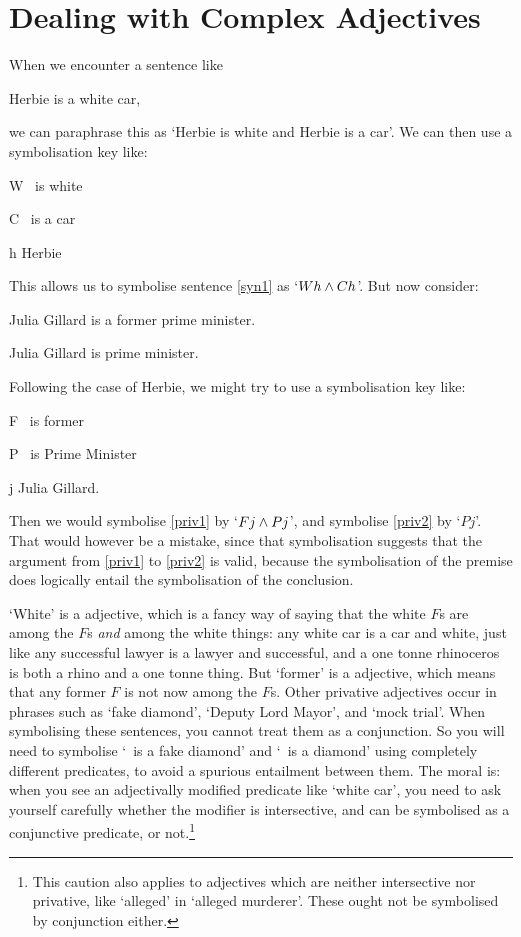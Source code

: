 \section{Dealing with Complex Adjectives}%
\label{s:complex_adj}
When we encounter a sentence like 
	\begin{earg}
		\item[\ex{syn1}] Herbie is a white car,
	\end{earg}
we can paraphrase this as `Herbie is white and Herbie is a car'. We can then use a symbolisation key like:
	\begin{ekey}
		\item[W] \blank\ is white
		\item[C] \blank\ is a car
		\item[h] Herbie
	\end{ekey}
This allows us to symbolise sentence \ref{syn1} as `$Wh \wedge Ch$'. But now consider:
\begin{earg}
	\item[\ex{priv1}] Julia Gillard is a former prime minister.
	\item[\ex{priv2}] Julia Gillard is prime minister.
\end{earg}
Following the case of Herbie, we might try to use a symbolisation key like:
	\begin{ekey}
		\item[F] \blank\ is former
		\item[P] \blank\ is Prime Minister
		\item[j] Julia Gillard.
	\end{ekey}
Then we would symbolise \ref{priv1} by `$Fj \wedge Pj$', and symbolise \ref{priv2} by `$Pj$'. That would however be a mistake, since that symbolisation suggests that the argument from \ref{priv1} to \ref{priv2} is valid, because the symbolisation of the premise does logically entail the symbolisation of the conclusion. 

`White' is a  adjective, which is a fancy way of saying that the white $F$s are among the $F$s \emph{and} among the white things: any white car is a car and white, just like any successful lawyer is a lawyer and successful, and a one tonne rhinoceros is both a rhino and a one tonne thing. But `former' is a  adjective, which means that any former $F$ is not now among the $F$s. Other privative adjectives occur in phrases such as `fake diamond', `Deputy Lord Mayor', and `mock trial'. When symbolising these sentences, you cannot treat them as a conjunction. So you will need to symbolise `\blank\ is a fake diamond' and `\blank\ is a diamond' using completely different predicates, to avoid a spurious entailment between them. The moral is: when you see an adjectivally modified predicate like `white car', you need to ask yourself carefully whether the modifier is intersective, and can be symbolised as a conjunctive predicate, or not.\footnote{This caution also applies to adjectives  which are neither intersective nor privative, like `alleged' in `alleged murderer'. These ought not be symbolised by conjunction either.}

